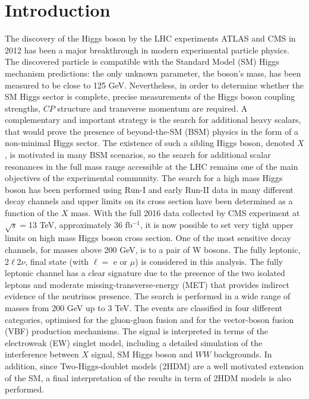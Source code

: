 \documentclass[PhD,binding=0.6cm]{../sapthesis}
\begin{document}
\chapter{Introduction}
The discovery of the Higgs boson by the LHC experiments ATLAS and CMS in 2012 has been a major breakthrough in modern experimental particle physics.
The discovered particle is compatible with the Standard Model (SM) Higgs mechanism predictions: the only unknown parameter, the boson's mass, has been
measured to be  close to 125 GeV. Nevertheless, in order to determine whether the SM Higgs sector is complete, precise measurements of the Higgs boson coupling strengths, $CP$ structure and transverse momentum are required. 
A complementary and important strategy is the search for additional heavy
scalars, that would prove the presence of  beyond-the-SM (BSM) physics in
the form of a non-minimal Higgs sector. The existence of such a sibling Higgs boson,
denoted $X$, is motivated in many BSM scenarios, so the search for additional scalar resonances in the full
mass range accessible at the LHC remains one of the main objectives of the experimental community.
The search for a high mass Higgs boson has been performed using Run-I and
early Run-II data in many different decay channels and upper limits on its cross section have been determined as a function of the $X$ mass. 
With the full 2016 data collected by CMS experiment at $\sqrt{s}=$13 TeV, approximately  36 fb$^{-1}$, 
it is now possible to set very tight upper limits on high mass Higgs boson cross section. 
One of the most sensitive decay channels, for masses above 200 GeV, is to a pair of W bosons. 
The fully leptonic, 2$\ell$2$\nu$,  final state (with $\ell =$ e or $\mu$) is considered in this analysis.
The fully leptonic channel has a clear signature due to the presence of the two isolated leptons and moderate missing-transverse-energy (MET) that provides indirect evidence of the neutrinos presence.
The search is performed in a wide range of masses from 200 GeV up to 3 TeV.
The  events are classified in four different categories, optimised for the gluon-gluon fusion and for the vector-boson fusion (VBF) production mechanisms.
The signal is interpreted in terms of the electroweak (EW) singlet model, including a detailed simulation of the interference between $X$ signal, SM Higgs boson  and $WW$ backgrounds.
In addition, since  Two-Higgs-doublet models (2HDM)  are a well motivated extension of the SM, a final interpretation of the results in term of 2HDM models is also performed.\\
\newline
\end{document}
